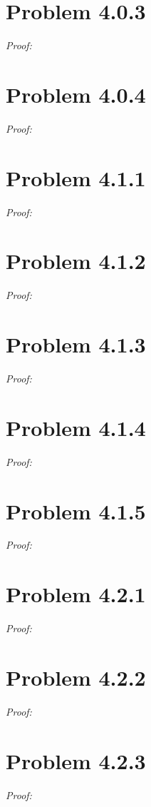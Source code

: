 \documentclass[11pt]{article}
\begin{document}
\section{Problem 4.0.3}
\textit{Proof:} 
\newpage

\section{Problem 4.0.4}
\textit{Proof:} 
\newpage

\section{Problem 4.1.1}
\textit{Proof:} 
\newpage

\section{Problem 4.1.2}
\textit{Proof:} 
\newpage

\section{Problem 4.1.3}
\textit{Proof:} 
\newpage

\section{Problem 4.1.4}
\textit{Proof:} 
\newpage

\section{Problem 4.1.5}
\textit{Proof:} 
\newpage

\section{Problem 4.2.1}
\textit{Proof:} 
\newpage

\section{Problem 4.2.2}
\textit{Proof:} 
\newpage

\section{Problem 4.2.3}
\textit{Proof:} 
\newpage
\end{document}
